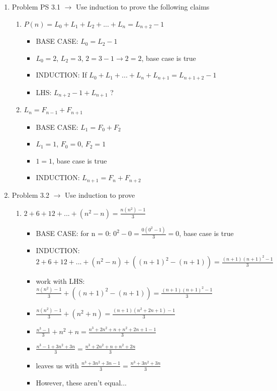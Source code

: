 \documentclass[11pt]{article}
\begin{document}
    \begin{enumerate}
        \item Problem PS 3.1 $\rightarrow$ Use induction to prove the following claims
        \begin{enumerate}
            \item $P(n) = L_0 + L_1 + L_2 + ... + L_n = L_{n+2} - 1$
            \begin{itemize}
                \item BASE CASE: $L_0 = L_2 - 1$
                \item $L_0 = 2$, $L_2 = 3$, $2 = 3-1 \rightarrow 2 = 2$, base case is true
                \item INDUCTION: If $L_0 + L_1 + ... + L_n + L_{n+1} = L_{n+1+2} - 1$
                \item LHS: $L_{n+2} - 1 + L_{n+1}$ ?
            \end{itemize}
            \item $L_n = F_{n-1} + F_{n+1}$
            \begin{itemize}
                \item BASE CASE: $L_1 = F_{0} + F_{2}$
                \item $L_1 = 1$, $F_{0} = 0$, $F_{2} = 1$ 
                \item $1 = 1$, base case is true
                \item INDUCTION: $L_{n+1} = F_n + F_{n+2}$
            \end{itemize}
        \end{enumerate}
        \item Problem 3.2 $\rightarrow$ Use induction to prove
        \begin{enumerate}
            \item $2 + 6 + 12 + ... + (n^2 -n) = \frac{n(n^2)-1}{3}$
            \begin{itemize}
                \item BASE CASE: for n = 0: $0^2 - 0 = \frac{0(0^2-1)}{3} = 0$, base case is true
                \item INDUCTION: $2 +6 + 12 + ... + (n^2 - n) + ((n+1)^2-(n+1)) = \frac{(n+1)(n+1)^2-1}{3}$
                \item work with LHS: $\frac{n(n^2)-1}{3} + ((n+1)^2-(n+1)) = \frac{(n+1)(n+1)^2-1}{3}$
                \item $\frac{n(n^2)-1}{3} + (n^2 + n) = \frac{(n+1)(n^2+2n+1)-1}{3}$
                \item $\frac{n^3-1}{3} + n^2 + n = \frac{n^3 + 2n^2 + n + n^2 + 2n + 1 - 1}{3}$
                \item $\frac{n^3 - 1 + 3n^2 + 3n}{3} = \frac{n^3 + 2n^2 + n + n^2 + 2n}{3}$
                \item leaves us with $\frac{n^3 + 3n^2 + 3n - 1}{3} = \frac{n^3 + 3n^2 + 3n}{3}$
                \item However, these aren't equal...
            \end{itemize}
        \end{enumerate}
    \end{enumerate}
\end{document}

